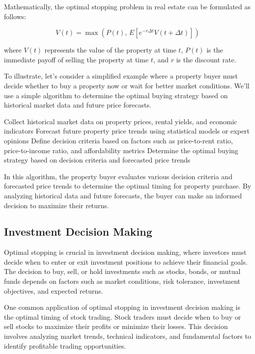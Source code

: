 \documentclass[12pt]{book} %
\begin{document}
Mathematically, the optimal stopping problem in real estate can be formulated as follows:

\[
V(t) = \max \left( P(t), \, E \left[ e^{-r\Delta t}V(t + \Delta t) \right] \right)
\]

where \(V(t)\) represents the value of the property at time \(t\), \(P(t)\) is the immediate payoff of selling the property at time \(t\), and \(r\) is the discount rate.

To illustrate, let's consider a simplified example where a property buyer must decide whether to buy a property now or wait for better market conditions. We'll use a simple algorithm to determine the optimal buying strategy based on historical market data and future price forecasts.

\FloatBarrier
\begin{algorithm}
\caption{Optimal Property Buying Strategy}
\begin{algorithmic}[1]
\State Collect historical market data on property prices, rental yields, and economic indicators
\State Forecast future property price trends using statistical models or expert opinions
\State Define decision criteria based on factors such as price-to-rent ratio, price-to-income ratio, and affordability metrics
\State Determine the optimal buying strategy based on decision criteria and forecasted price trends
\end{algorithmic}
\end{algorithm}
\FloatBarrier

In this algorithm, the property buyer evaluates various decision criteria and forecasted price trends to determine the optimal timing for property purchase. By analyzing historical data and future forecasts, the buyer can make an informed decision to maximize their returns.

\subsection{Investment Decision Making}

Optimal stopping is crucial in investment decision making, where investors must decide when to enter or exit investment positions to achieve their financial goals. The decision to buy, sell, or hold investments such as stocks, bonds, or mutual funds depends on factors such as market conditions, risk tolerance, investment objectives, and expected returns.

One common application of optimal stopping in investment decision making is the optimal timing of stock trading. Stock traders must decide when to buy or sell stocks to maximize their profits or minimize their losses. This decision involves analyzing market trends, technical indicators, and fundamental factors to identify profitable trading opportunities.
\end{document}
